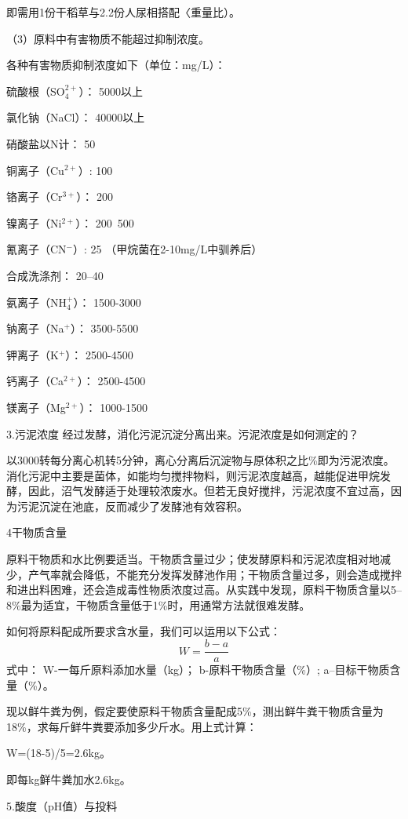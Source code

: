 \documentclass{ctexbook}
\begin{document}
即需用1份干稻草与2.2份人尿相搭配〈重量比）。

（3）原料中有害物质不能超过抑制浓度。

各种有害物质抑制浓度如下（单位：mg/L）：

硫酸根（SO$_4^{2+}$）：	5000以上

氯化钠（NaCl）：	40000以上

硝酸盐以N计：	50

铜离子（Cu$^{2+}$）:    100

铬离子（Cr$^{3+}$）：	  200

镍离子（Ni$^{2+}$）：	  200~500

氰离子（CN$^{-}$）:	25 （甲烷菌在2-10mg/L中驯养后）

合成洗涤剂：	20--40

氨离子（NH$_4^{+}$）：	1500-3000

钠离子（Na$^{+}$）：	3500-5500

钾离子（K$^{+}$）：	2500-4500

钙离子（Ca$^{2+}$）：	2500-4500

镁离子（Mg$^{2+}$）：	1000-1500

3.污泥浓度	
经过发酵，消化污泥沉淀分离出来。污泥浓度是如何测定的？

以3000转每分离心机转5分钟，离心分离后沉淀物与原体积之比\%即为污泥浓度。消化污泥中主要是菌体，如能均匀搅拌物料，则污泥浓度越高，越能促进甲烷发酵，因此，沼气发酵适于处理较浓废水。但若无良好搅拌，污泥浓度不宜过高，因为污泥沉淀在池底，反而减少了发酵池有效容积。

4干物质含量

原料干物质和水比例要适当。干物质含量过少；使发酵原料和污泥浓度相对地减少，产气率就会降低，不能充分发挥发酵池作用；干物质含量过多，则会造成搅拌和进出料困难，还会造成毒性物质浓度过高。从实践中发现，原料干物质含量以5--8\%最为适宜，干物质含量低于1\%时，用通常方法就很难发酵。

如何将原料配成所要求含水量，我们可以运用以下公式：
\begin{equation*}
	W=\frac{b-a}{a}
\end{equation*}
式中：	
W-一每斤原料添加水量（kg）；
b-原料干物质含量（\%）;
a--目标干物质含量（\%）。

现以鲜牛粪为例，假定要使原料干物质含量配成5\%，测出鲜牛粪干物质含量为18\%，求每斤鲜牛粪要添加多少斤水。用上式计算：

W=(18-5)/5=2.6kg。

即每kg鲜牛粪加水2.6kg。

5.酸度（pH值）与投料
\end{document}
